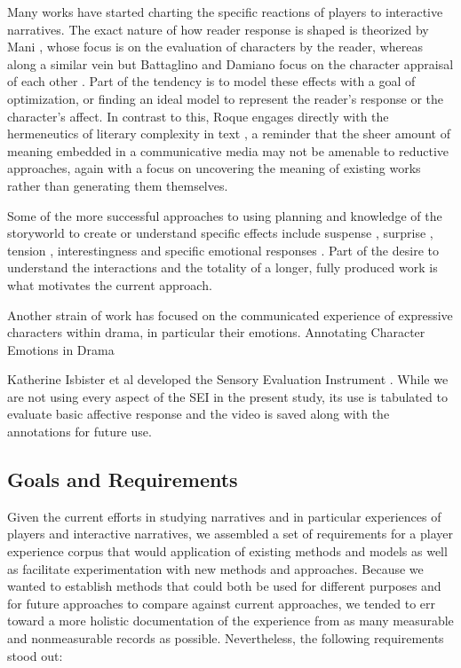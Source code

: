 Many works have started charting the specific reactions of players to
interactive narratives. The exact nature of how reader response is
shaped is theorized by Mani \cite{Mani2010-sh}, whose focus is on the
evaluation of characters by the reader, whereas along a similar vein
but Battaglino and Damiano focus on the character appraisal of each
other \cite{Battaglino2014-gh}. Part of the tendency is to model these
effects with a goal of optimization, or finding an ideal model to
represent the reader’s response or the character’s affect. In contrast
to this, Roque engages directly with the hermeneutics of literary
complexity in text \cite{Roque2012-fd}, a reminder that the sheer
amount of meaning embedded in a communicative media may not be
amenable to reductive approaches, again with a focus on uncovering the
meaning of existing works rather than generating them themselves.

Some of the more successful approaches to using planning and knowledge
of the storyworld to create or understand specific effects include
suspense \cite{Cheong2007-ts}, surprise \cite{Bae2008-js}, tension
\cite{Szilas_undated-am}, interestingness and specific emotional
responses \cite{Roberts2009-km,Hernandez2014-hd}.  Part of the desire
to understand the interactions and the totality of a longer, fully
produced work is what motivates the current approach.

Another strain of work has focused on the communicated experience of
expressive characters within drama, in particular their
emotions. Annotating Character Emotions in Drama
\cite{Damiano_undated-sx}

Katherine Isbister et al developed the Sensory Evaluation Instrument
\cite{Isbister2006-sc,Laaksolahti2009-uw}. While we are not using
every aspect of the SEI in the present study, its use is tabulated to
evaluate basic affective response and the video is saved along with
the annotations for future use.
\subsection{Goals and Requirements}
\label{sec:orgheadline7}
Given the current efforts in studying narratives and in particular
experiences of players and interactive narratives, we assembled a set
of requirements for a player experience corpus that would application
of existing methods and models as well as facilitate experimentation
with new methods and approaches. Because we wanted to establish
methods that could both be used for different purposes and for future
approaches to compare against current approaches, we tended to err
toward a more holistic documentation of the experience from as many
measurable and nonmeasurable records as possible. Nevertheless, the
following requirements stood out:

